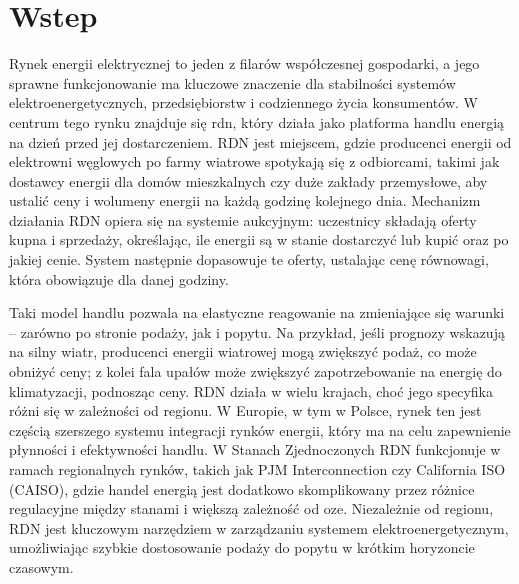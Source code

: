 \chapter{Wstep}
\label{ch:wstep}
Rynek energii elektrycznej to jeden z filarów współczesnej gospodarki, a jego sprawne funkcjonowanie ma kluczowe znaczenie dla stabilności systemów elektroenergetycznych, przedsiębiorstw i codziennego życia konsumentów. W centrum tego rynku znajduje się \gls{rdn}, który działa jako platforma handlu energią na dzień przed jej dostarczeniem. RDN jest miejscem, gdzie producenci energii od elektrowni węglowych po farmy wiatrowe spotykają się z odbiorcami, takimi jak dostawcy energii dla domów mieszkalnych czy duże zakłady przemysłowe, aby ustalić ceny i wolumeny energii na każdą godzinę kolejnego dnia. Mechanizm działania RDN opiera się na systemie aukcyjnym: uczestnicy składają oferty kupna i sprzedaży, określając, ile energii są w stanie dostarczyć lub kupić oraz po jakiej cenie. System następnie dopasowuje te oferty, ustalając cenę równowagi, która obowiązuje dla danej godziny.

Taki model handlu pozwala na elastyczne reagowanie na zmieniające się warunki – zarówno po stronie podaży, jak i popytu. Na przykład, jeśli prognozy wskazują na silny wiatr, producenci energii wiatrowej mogą zwiększyć podaż, co może obniżyć ceny; z kolei fala upałów może zwiększyć zapotrzebowanie na energię do klimatyzacji, podnosząc ceny. RDN działa w wielu krajach, choć jego specyfika różni się w zależności od regionu. W Europie, w tym w Polsce, rynek ten jest częścią szerszego systemu integracji rynków energii, który ma na celu zapewnienie płynności i efektywności handlu. W Stanach Zjednoczonych RDN funkcjonuje w ramach regionalnych rynków, takich jak PJM Interconnection czy California ISO (CAISO), gdzie handel energią jest dodatkowo skomplikowany przez różnice regulacyjne między stanami i większą zależność od \gls{oze}. Niezależnie od regionu, RDN jest kluczowym narzędziem w zarządzaniu systemem elektroenergetycznym, umożliwiając szybkie dostosowanie podaży do popytu w krótkim horyzoncie czasowym.

